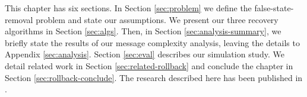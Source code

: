 This chapter has six sections. In Section \ref{sec:problem} we define the false-state-removal problem and state our assumptions.
We present our three recovery algorithms in Section \ref{sec:algs}.  Then, in Section \ref{sec:analysis-summary}, we briefly state the results of our message complexity analysis, leaving 
the details to Appendix \ref{sec:analysis}.
Section \ref{sec:eval} describes our simulation study. We detail related work in Section \ref{sec:related-rollback} and conclude the chapter 
in Section \ref{sec:rollback-conclude}.  The research described here has been published in \cite{Gyllstrom10}.




